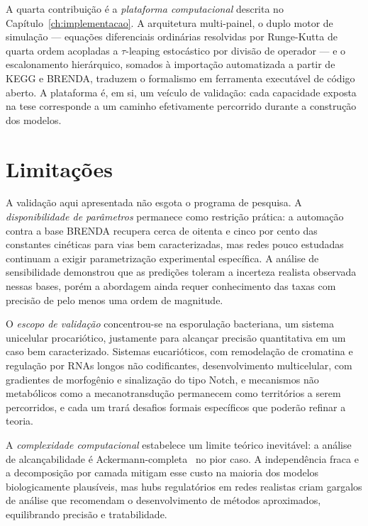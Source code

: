 \begin{sloppypar}
A quarta contribuição é a \emph{plataforma computacional} descrita no
Capítulo~\ref{ch:implementacao}. A arquitetura multi-painel, o duplo motor de
simulação --- equações diferenciais ordinárias resolvidas por Runge-Kutta de
quarta ordem acopladas a $\tau$-leaping estocástico por divisão de operador
--- e o escalonamento hierárquico, somados à importação automatizada a partir
de KEGG e BRENDA, traduzem o formalismo em ferramenta executável de código
aberto. A plataforma é, em si, um veículo de validação: cada capacidade
exposta na tese corresponde a um caminho efetivamente percorrido durante a
construção dos modelos.
\end{sloppypar}

\section{Limitações}
\label{sec:limitacoes-extensoes}

A validação aqui apresentada não esgota o programa de pesquisa. A
\emph{disponibilidade de parâmetros} permanece como restrição prática: a
automação contra a base BRENDA recupera cerca de oitenta e cinco por cento
das constantes cinéticas para vias bem caracterizadas, mas redes pouco
estudadas continuam a exigir parametrização experimental específica. A
análise de sensibilidade demonstrou que as predições toleram a incerteza
realista observada nessas bases, porém a abordagem ainda requer conhecimento
das taxas com precisão de pelo menos uma ordem de magnitude.

O \emph{escopo de validação} concentrou-se na esporulação bacteriana, um
sistema unicelular procariótico, justamente para alcançar precisão
quantitativa em um caso bem caracterizado. Sistemas eucarióticos, com
remodelação de cromatina e regulação por RNAs longos não codificantes,
desenvolvimento multicelular, com gradientes de morfogênio e sinalização
do tipo Notch, e mecanismos não metabólicos como a mecanotransdução
permanecem como territórios a serem percorridos, e cada um trará desafios
formais específicos que poderão refinar a teoria.

A \emph{complexidade computacional} estabelece um limite teórico inevitável:
a análise de alcançabilidade é Ackermann-completa~\cite{Czerwinski2021} no pior caso. A
independência fraca e a decomposição por camada mitigam esse custo na
maioria dos modelos biologicamente plausíveis, mas hubs regulatórios em
redes realistas criam gargalos de análise que recomendam o desenvolvimento
de métodos aproximados, equilibrando precisão e tratabilidade.

